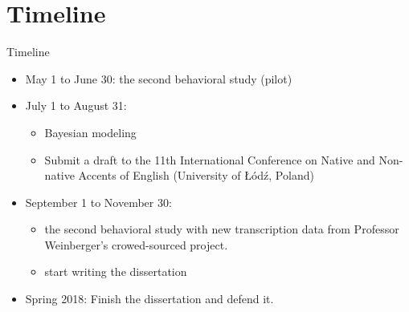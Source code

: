 \documentclass{beamer}
\begin{document}


\section{Timeline}
\begin{frame}
\begin{block}{Timeline}
\begin{itemize}
\item May 1 to June 30: \linebreak the second behavioral study (pilot)
\item July 1 to August 31: 
\begin{itemize}
\item Bayesian modeling
\item Submit a draft to the 11th International Conference on Native and Non-native Accents of English (University of \L{}\'{o}d\'{z},
 Poland)
\end{itemize}
\item September 1 to November 30:
\begin{itemize}
\item the second behavioral study with new transcription data from Professor Weinberger's crowed-sourced project.
\item start writing the dissertation 
\end{itemize}
\item Spring 2018: Finish the dissertation and defend it. 
\end{itemize}
\end{block}
\end{frame}
\end{document}

